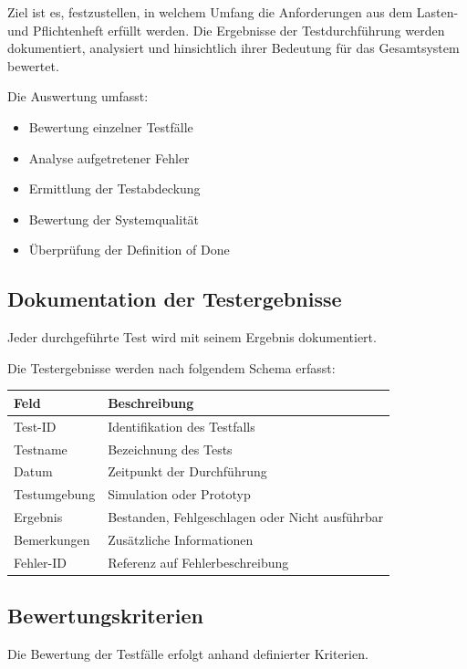 \documentclass[
  a4paper,
  12pt,
  DIV=12,        %
  parskip=half,  %
  headings=small %
]{scrartcl}
\theoremstyle{definition}
\providecommand{\tightlist}{%
  \setlength{\itemsep}{0pt}\setlength{\parskip}{0pt}}
\theoremstyle{definition}
\begin{document}
Ziel ist es, festzustellen, in welchem Umfang die Anforderungen aus dem
Lasten- und Pflichtenheft erfüllt werden. Die Ergebnisse der
Testdurchführung werden dokumentiert, analysiert und hinsichtlich ihrer
Bedeutung für das Gesamtsystem bewertet.

Die Auswertung umfasst:

\begin{itemize}
\tightlist
\item
  Bewertung einzelner Testfälle
\item
  Analyse aufgetretener Fehler
\item
  Ermittlung der Testabdeckung
\item
  Bewertung der Systemqualität
\item
  Überprüfung der Definition of Done
\end{itemize}

\subsection{Dokumentation der
Testergebnisse}\label{dokumentation-der-testergebnisse}

Jeder durchgeführte Test wird mit seinem Ergebnis dokumentiert.

Die Testergebnisse werden nach folgendem Schema erfasst:

\begin{longtable}[]{@{}ll@{}}
\toprule\noalign{}
Feld & Beschreibung \\
\midrule\noalign{}
\endhead
\bottomrule\noalign{}
\endlastfoot
Test-ID & Identifikation des Testfalls \\
Testname & Bezeichnung des Tests \\
Datum & Zeitpunkt der Durchführung \\
Testumgebung & Simulation oder Prototyp \\
Ergebnis & Bestanden, Fehlgeschlagen oder Nicht ausführbar \\
Bemerkungen & Zusätzliche Informationen \\
Fehler-ID & Referenz auf Fehlerbeschreibung \\
\end{longtable}

\subsection{Bewertungskriterien}\label{bewertungskriterien}

Die Bewertung der Testfälle erfolgt anhand definierter Kriterien.
\end{document}
